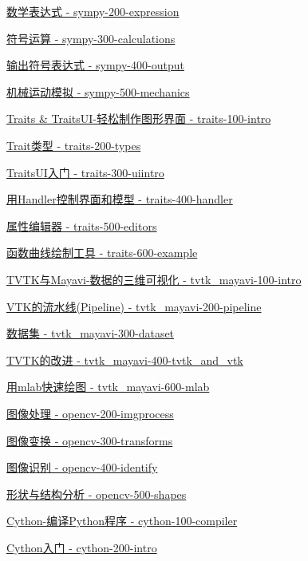 \documentclass[11pt]{article}
\begin{document}
\href{06-sympy/sympy-200-expression.ipynb}{数学表达式 -
sympy-200-expression}

\href{06-sympy/sympy-300-calculations.ipynb}{符号运算 -
sympy-300-calculations}

\href{06-sympy/sympy-400-output.ipynb}{输出符号表达式 -
sympy-400-output}

\href{06-sympy/sympy-500-mechanics.ipynb}{机械运动模拟 -
sympy-500-mechanics}

\href{07-traits/traits-100-intro.ipynb}{Traits \&
TraitsUI-轻松制作图形界面 - traits-100-intro}

\href{07-traits/traits-200-types.ipynb}{Trait类型 - traits-200-types}

\href{07-traits/traits-300-uiintro.ipynb}{TraitsUI入门 -
traits-300-uiintro}

\href{07-traits/traits-400-handler.ipynb}{用Handler控制界面和模型 -
traits-400-handler}

\href{07-traits/traits-500-editors.ipynb}{属性编辑器 -
traits-500-editors}

\href{07-traits/traits-600-example.ipynb}{函数曲线绘制工具 -
traits-600-example}

\href{08-tvtk_mayavi/tvtk_mayavi-100-intro.ipynb}{TVTK与Mayavi-数据的三维可视化
- tvtk\_mayavi-100-intro}

\href{08-tvtk_mayavi/tvtk_mayavi-200-pipeline.ipynb}{VTK的流水线(Pipeline)
- tvtk\_mayavi-200-pipeline}

\href{08-tvtk_mayavi/tvtk_mayavi-300-dataset.ipynb}{数据集 -
tvtk\_mayavi-300-dataset}

\href{08-tvtk_mayavi/tvtk_mayavi-400-tvtk_and_vtk.ipynb}{TVTK的改进 -
tvtk\_mayavi-400-tvtk\_and\_vtk}

\href{08-tvtk_mayavi/tvtk_mayavi-600-mlab.ipynb}{用mlab快速绘图 -
tvtk\_mayavi-600-mlab}

\href{09-opencv/opencv-200-imgprocess.ipynb}{图像处理 -
opencv-200-imgprocess}

\href{09-opencv/opencv-300-transforms.ipynb}{图像变换 -
opencv-300-transforms}

\href{09-opencv/opencv-400-identify.ipynb}{图像识别 -
opencv-400-identify}

\href{09-opencv/opencv-500-shapes.ipynb}{形状与结构分析 -
opencv-500-shapes}

\href{10-cython/cython-100-compiler.ipynb}{Cython-编译Python程序 -
cython-100-compiler}

\href{10-cython/cython-200-intro.ipynb}{Cython入门 - cython-200-intro}
\end{document}
